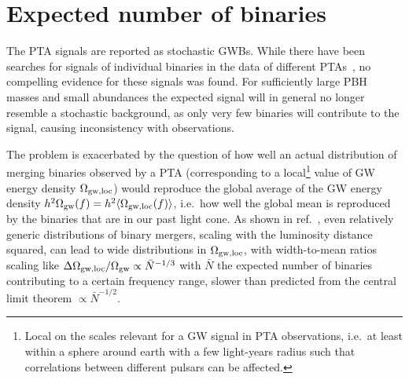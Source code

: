 \section{Expected number of binaries} \label{sec:NPBH}
The \ac{PTA} signals are reported as stochastic \acp{GWB}. While there   have been searches for signals of individual binaries in the data of different \acp{PTA}~\cite{IPTA:2023ero,Antoniadis:2023aac,NANOGrav:2023pdq}, no compelling evidence for these signals  was found. For sufficiently large \ac{PBH} masses and small abundances the expected signal will in general no longer resemble a stochastic background, as only very few binaries will contribute to the signal, causing inconsistency with observations.

The problem is exacerbated by the question of how well an actual distribution of merging binaries observed by a \ac{PTA} (corresponding to a local\footnote{Local on the scales relevant for a \ac{GW} signal in \ac{PTA} observations, i.e.\ at least within a sphere around earth with a few light-years radius such that correlations between different pulsars can be affected.} value of \Ac{GW} energy density $\Omega_{\text{gw}, \mathrm{loc}}$) would reproduce the global average of the \ac{GW} energy density $h^2 \Omega_{\text{gw}} (f) = h^2 \langle \Omega_{\text{gw}, \mathrm{loc}} (f) \rangle$, i.e.\ how well the global mean is reproduced by the binaries that are in our past light cone. As shown in ref.~\cite{Ellis:2023owy}, even relatively generic distributions of binary  mergers, scaling with the luminosity distance squared, can lead to wide distributions in $\Omega_{\text{gw}, \mathrm{loc}}$, with width-to-mean ratios scaling like $\Delta \Omega_{\text{gw}, \mathrm{loc}} / \Omega_{\text{gw}} \propto  \bar{N}^{-1/3}$ with $\bar{N}$ the expected number of binaries contributing to a certain frequency range, slower than predicted from the central limit theorem $\propto \bar{N}^{-1/2}$.

